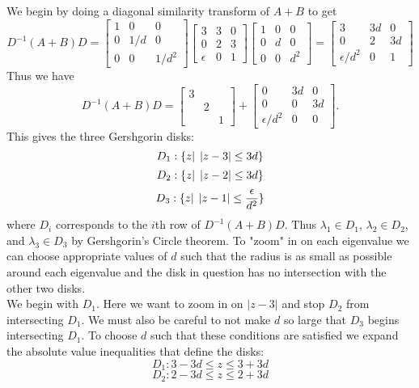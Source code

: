 \documentclass[12pt]{article}
\numberwithin{equation}{section}
\begin{document}
\begin{enumerate}
\begin{enumerate}
    We begin by doing a diagonal similarity transform of $A+B$ to get
    $$D^{-1}(A+B)D=\left[\begin{array}{ccc}1&0&0\\0&1/d&0\\0&0&1/d^2\end{array}\right]\left[\begin{array}{ccc}3&3&0\\0&2&3\\ \epsilon &0&1\end{array}\right]\left[\begin{array}{ccc}1&0&0\\0&d&0\\0&0&d^2\end{array}\right]=\left[\begin{array}{ccc}3&3d&0\\0&2&3d\\ \epsilon/d^2&0&1\end{array}\right]$$
    Thus we have
    $$D^{-1}(A+B)D=\left[\begin{array}{ccc}3&&\\&2&\\&&1\end{array}\right]+\left[\begin{array}{ccc}0&3d&0\\0&0&3d\\ \epsilon/d^2&0&0\end{array}\right].$$
    This gives the three Gershgorin disks:
    $$D_1:\{z|\hspace{1 ex} |z-3|\leq 3d\}$$
    $$D_2:\{z|\hspace{1 ex} |z-2|\leq 3d\}$$
    $$D_3:\{z|\hspace{1 ex} |z-1|\leq \frac{\epsilon}{d^2}\}$$
    where $D_i$ corresponds to the $i$th row of $D^{-1}(A+B)D$. Thus $\lambda_1\in D_1$, $\lambda_2\in D_2$, and $\lambda_3\in D_3$ by Gershgorin's Circle theorem. To "zoom" in on each eigenvalue we can choose appropriate values of $d$ such that the radius is as small as possible around each eigenvalue and the disk in question has no intersection with the other two disks.\\
    We begin with $D_1$. Here we want to zoom in on $|z-3|$ and stop $D_2$ from intersecting $D_1$. We must also be careful to not make $d$ so large that $D_3$ begins intersecting $D_1$. To choose $d$ such that these conditions are satisfied we expand the absolute value inequalities that define the disks:
    $$D_1: 3-3d\leq z\leq 3+3d$$
    $$D_2:2-3d\leq z\leq 2+3d$$

\end{enumerate}
\end{enumerate}
\end{document}
